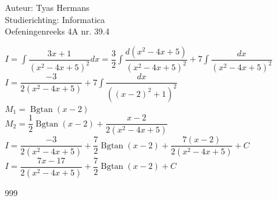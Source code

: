 \documentclass[a4paper]{article}
\newcommand{\dint}{\displaystyle\int}
\newcommand{\bgtan}{\operatorname{Bgtan}}
\begin{document}
  
\noindent \large Auteur: Tyas Hermans \\
\noindent \large Studierichting: Informatica\\
\noindent \large Oefeningenreeks 4A nr. 39.4\\

\medskip

\normalsize

$I = \dint\dfrac{3x+1}{(x^2-4x+5)^2}dx = \dfrac{3}{2}\dint\dfrac{d(x^2-4x+5)}{(x^2-4x+5)^2} + 7\dint\dfrac{dx}{(x^2-4x+5)^2}$\\

$I = \dfrac{-3}{2(x^2-4x+5)} + 7\dint\dfrac{dx}{((x-2)^2+1)^2}$\\

$M_1 = \bgtan(x-2)$\\

$M_2 = \dfrac{1}{2}\bgtan(x-2)+\dfrac{x-2}{2(x^2-4x+5)}$\\

$I = \dfrac{-3}{2(x^2-4x+5)} +\dfrac{7}{2}\bgtan(x-2)+\dfrac{7(x-2)}{2(x^2-4x+5)} + C$\\

$I = \dfrac{7x-17}{2(x^2-4x+5)} + \dfrac{7}{2}\bgtan(x-2) + C$\\



\begin{thebibliography}{999}
\end{thebibliography}
\end{document}
